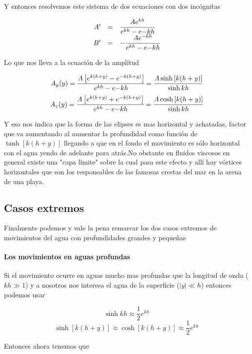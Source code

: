 \documentclass[a4paper,spanish]{article}
\numberwithin{equation}{section}
\begin{document}
Y entonces resolvemos este sistema de dos ecuaciones con dos inc\'ognitas

\[
\begin{array}{rcl}
A' & = & \cfrac{Ae^{kh}}{e^{kh}-e{-kh}} \\
B' & = & -\cfrac{Ae^{-kh}}{e^{kh}-e{-kh}} 
\end{array}
\]

Lo que nos lleva a la ecuaci\'on de la amplitud

\begin{equation}
A_y(y)=\cfrac{A\left[e^{k(h+y)}-e^{-k(h+y)}\right]}{e^{kh}-e{-kh}}=\cfrac{A\sinh\left[k(h+y)\right]}{\sinh{kh}}
\label{amplitud_y_fluido}
\end{equation}
\begin{equation}
A_z(y)=\cfrac{A\left[e^{k(h+y)}+e^{-k(h+y)}\right]}{e^{kh}-e{-kh}}=\cfrac{A\cosh\left[k(h+y)\right]}{\sinh{kh}}
\label{amplitud_z_fluido}
\end{equation}

Y eso nos indica que la forma de las elipses es mas horizontal y achatadas, factor que va aumentando al aumentar la profundidad como funci\'on de $\tanh[k(h+y)]$ llegando a que en el fondo el movimiento es s\'olo horizontal con el agua yendo de adelante para atr\'as.No obstante en fluidos viscosos en general existe una "capa l\'imite" sobre la cual pasa este efecto y all\'i hay v\'ortices horizontales que son los responsables de las famosas crestas del mar en la arena de una playa.

\subsection{Casos extremos}

Finalmente podemos y vale la pena remarcar los dos casos extremos de movimientos del agua con profundidades grandes y peque\~nas

\paragraph{Los movimientos en aguas profundas}
Si el movimiento ocurre en aguas mucho mas profundas que la longitud de onda ($kh \gg 1$) y a nosotros nos interesa el agua de la superficie ($\vert y \vert \ll h$) entonces podemos usar

\[\sinh{kh}\approx \frac{1}{2}e^{kh}\]
\[\sinh[k(h+y)]\approx \cosh[k(h+y)] \approx \frac{1}{2}e^{kh}\]

Entonces ahora tenemos que
\end{document}
